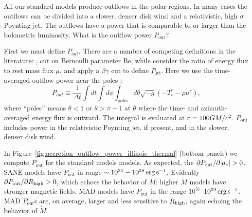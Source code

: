 All our standard models produce outflows in the polar regions.  In many cases the outflows can be divided into a slower, denser disk wind and a relativistic, high $\sigma$ Poynting jet.  The outflows have a power that is comparable to or larger than the bolometric luminosity.  What is the outflow power $P_\mathrm{out}$?


First we must define $P_{out}$.  There are a number of competing definitions in the literature: \citet{refId0}, \citet{2014A&A...570A...7M} cut on  Bernoulli parameter Be, while \citet{10.1111/j.1365-2966.2012.22002.x} consider the ratio of energy flux to rest mass flux $\mu$, and  apply a $\beta\gamma$ cut to define $P_\mathrm{jet}$.  Here we use the time-averaged outflow power near the poles :
\begin{equation}
  P_{out} \equiv \frac{1}{\Delta t}\int dt \int d\phi \int_\mathrm{poles} d\theta \sqrt{-g}\left(-T^{r}_{t}-\rho u^{r}\right),
\end{equation}
where ``poles'' means $\theta<1$ or $\theta>\pi-1$ at $\theta$ where the time- and azimuth-averaged energy flux is outward.  The integral is evaluated at $r=100GM/c^2$. $P_\mathrm{out}$ includes power in the relativistic Poynting jet, if present, and in the slower, denser disk wind.

In Figure~\ref{fig:accretion_outflow_power_illinois_thermal}
(bottom panels) we compute $P_\mathrm{out}$ for the standard models models. As expected, the $\partial P_\mathrm{out}/\partial |a_*| > 0$. SANE models have $P_\mathrm{out}$ in range $\sim 10^{35}-10^{38} \,\mathrm{erg\,s^{-1}}$.  Evidently $\partial P_\mathrm{out}/\partial R_\mathrm{high} > 0$, which echoes the behavior of $\dot{M}$: higher $\dot{M}$ models have stronger magnetic fields. MAD models have $P_\mathrm{out}$ in the range $10^{37}$--$10^{39} \,\mathrm{erg\,s^{-1}}$.  MAD $P_\mathrm{out}$s are, on average, larger and less sensitive to $R_\mathrm{high}$, again echoing the behavior of $\dot{M}$.

